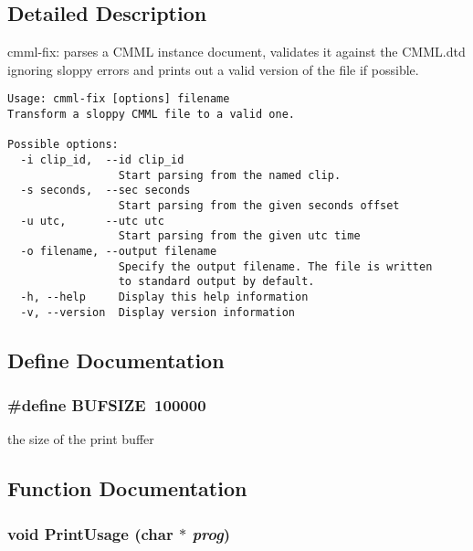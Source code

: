 \subsection{Detailed Description}
cmml-fix: parses a CMML instance document, validates it against the CMML.dtd ignoring sloppy errors and prints out a valid version of the file if possible.



\footnotesize\begin{verbatim}
Usage: cmml-fix [options] filename
Transform a sloppy CMML file to a valid one.
 
Possible options:
  -i clip_id,  --id clip_id
                 Start parsing from the named clip.
  -s seconds,  --sec seconds
                 Start parsing from the given seconds offset
  -u utc,      --utc utc
                 Start parsing from the given utc time
  -o filename, --output filename
                 Specify the output filename. The file is written
                 to standard output by default.
  -h, --help     Display this help information
  -v, --version  Display version information
\end{verbatim}
\normalsize


\subsection{Define Documentation}
\subsubsection{\setlength{\rightskip}{0pt plus 5cm}\#define BUFSIZE\ 100000}\label{cmml-fix_8c_a0}


the size of the print buffer 

\subsection{Function Documentation}
\subsubsection{\setlength{\rightskip}{0pt plus 5cm}void Print\-Usage (char $\ast$ {\em prog})\hspace{0.3cm}{\tt  [static]}}\label{cmml-fix_8c_a2}


